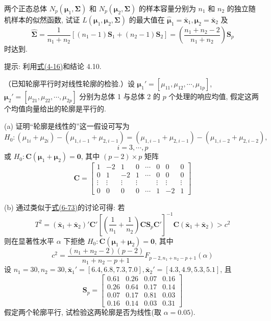 
两个正态总体 $N_p(\boldsymbol{\mu}_1,\boldsymbol{\Sigma})$ 和 $N_p(\boldsymbol{\mu}_2,\boldsymbol{\Sigma})$ 的样本容量分别为 $n_1$ 和 $n_2$ 的独立随机样本的似然函数, 试证 $L(\boldsymbol{\mu}_1,\boldsymbol{\mu}_2,\boldsymbol{\Sigma})$ 的最大值在 $\hat{\boldsymbol{\mu}}_1=\bar{\mathbf{x}}_1,\hat{\boldsymbol{\mu}}_2=\bar{\mathbf{x}}_2$ 及
\[
\hat{\boldsymbol{\Sigma}}=\frac{1}{n_1+n_2}\left[(n_1-1)\mathbf{S}_1+(n_2-1)\mathbf{S}_2\right]=\left(\frac{n_1+n_2-2}{n_1+n_2}\right)\mathbf{S}_p
\]
时达到.

提示: 利用\hyperref[eq:4-16]{式(4-16)}和结论 4.10.

\quad （已知轮廓平行时对线性轮廓的检验.）设 $\boldsymbol{\mu}_1'=[\mu_{11},\mu_{12},\cdots,\mu_{1p}]$, $\boldsymbol{\mu}_2'=[\mu_{21},\mu_{22},\cdots,\mu_{2p}]$ 分别为总体 1 与总体 2 的 $p$ 个处理的响应均值, 假定这两个均值向量给出的轮廓是平行的.

\noindent (a) 证明“轮廓是线性的”这一假设可写为
\[
H_0: (\mu_{1i}+\mu_{2i})-(\mu_{1,i-1}+\mu_{2,i-1})=(\mu_{1,i-1}+\mu_{2,i-1})-(\mu_{1,i-2}+\mu_{2,i-2}),
\]
\[
i=3,\cdots,p
\]
或 $H_0: \mathbf{C}(\boldsymbol{\mu}_1+\boldsymbol{\mu}_2)=\mathbf{0}$, 其中 $(p-2)\times p$ 矩阵
\[
\mathbf{C}=\begin{bmatrix}1&-2&1&0&\cdots&0&0&0\\0&1&-2&1&\cdots&0&0&0\\\vdots&\vdots&\vdots&\vdots&&\vdots&\vdots&\vdots\\0&0&0&0&\cdots&1&-2&1\end{bmatrix}
\]

\noindent (b) 通过类似于\hyperref[eq:6-73]{式(6-73)}的讨论可得: 若
\[
T^2=(\bar{\mathbf{x}}_1+\bar{\mathbf{x}}_2)'\mathbf{C}'\left[\left(\frac{1}{n_1}+\frac{1}{n_2}\right)\mathbf{C}\mathbf{S}_p\mathbf{C}'\right]^{-1}\mathbf{C}(\bar{\mathbf{x}}_1+\bar{\mathbf{x}}_2)>c^2
\]
则在显著性水平 $\alpha$ 下拒绝 $H_0: \mathbf{C}(\boldsymbol{\mu}_1+\boldsymbol{\mu}_2)=\mathbf{0}$, 其中
\[
c^2=\frac{(n_1+n_2-2)(p-2)}{n_1+n_2-p+1}F_{p-2,n_1+n_2-p+1}(\alpha)
\]
设 $n_1=30, n_2=30, \bar{\mathbf{x}}_1'=[6.4,6.8,7.3,7.0], \bar{\mathbf{x}}_2'=[4.3,4.9,5.3,5.1]$, 且
\[
\mathbf{S}_p=\begin{bmatrix}0.61&0.26&0.07&0.16\\0.26&0.64&0.17&0.14\\0.07&0.17&0.81&0.03\\0.16&0.14&0.03&0.31\end{bmatrix}
\]
假定两个轮廓平行, 试检验这两轮廓是否为线性(取 $\alpha=0.05$).

